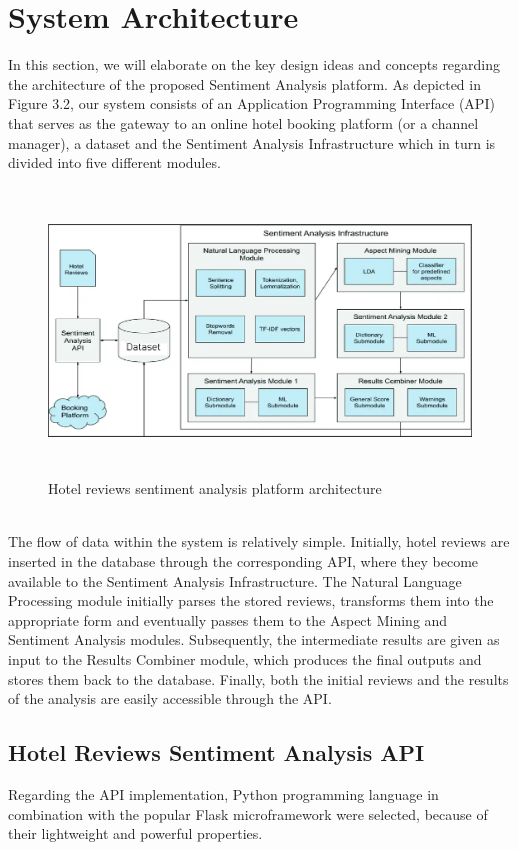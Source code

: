 \documentclass[a4paper, 12pt]{report}
\begin{document}
\section{System Architecture}
In this section, we will elaborate on the key design ideas and concepts regarding the architecture of the proposed Sentiment Analysis platform. As depicted in Figure 3.2, our system consists of an Application Programming Interface (API) that serves as the gateway to an online hotel booking platform (or a channel manager), a dataset and the Sentiment Analysis Infrastructure which in turn is divided into five different modules.\\
\begin{figure}[h]
	\includegraphics[height=3in,width=6in]{b}
	\caption{Hotel reviews sentiment analysis platform architecture }
	\label{Fig.}
\end{figure}\\
The flow of data within the system is relatively simple. Initially, hotel reviews are inserted in the database through the corresponding API, where they become available to the Sentiment Analysis Infrastructure. The Natural Language Processing module initially parses the stored reviews, transforms them into the appropriate form and eventually passes them to the Aspect Mining and Sentiment Analysis modules. Subsequently, the intermediate results are given as input to the Results Combiner module, which produces the final outputs and stores them back to the database. Finally, both the initial reviews and the results of the analysis are easily accessible through the API.
\subsection{Hotel Reviews Sentiment Analysis API}
Regarding the API implementation, Python programming language in combination with the popular Flask microframework were selected, because of their lightweight and powerful properties.
\end{document}
